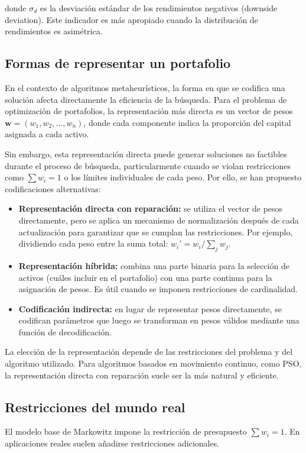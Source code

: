 \documentclass[12pt]{article}
\begin{document}
donde $\sigma_d$ es la desviación estándar de los rendimientos
negativos (downside deviation). Este indicador es más apropiado
cuando la distribución de rendimientos es asimétrica.

\subsection{Formas de representar un portafolio}

En el contexto de algoritmos metaheurísticos, la forma en que se
codifica una solución afecta directamente la eficiencia de la
búsqueda. Para el problema de optimización de portafolios, la
representación más directa es un vector de pesos $\mathbf{w} = (w_1,
w_2, \ldots, w_n)$, donde cada componente indica la proporción del
capital asignada a cada activo.

Sin embargo, esta representación directa puede generar soluciones no
factibles durante el proceso de búsqueda, particularmente cuando se
violan restricciones como $\sum w_i = 1$ o los límites individuales
de cada peso. Por ello, se han propuesto codificaciones alternativas:

\begin{itemize}
  \item \textbf{Representación directa con reparación:} se utiliza el
    vector de pesos directamente, pero se aplica un mecanismo de
    normalización después de cada actualización para garantizar que
    se cumplan las restricciones. Por ejemplo, dividiendo cada peso
    entre la suma total: $w_i' = w_i / \sum_{j} w_j$.

  \item \textbf{Representación híbrida:} combina una parte binaria
    para la selección de activos (cuáles incluir en el portafolio)
    con una parte continua para la asignación de pesos. Es útil
    cuando se imponen restricciones de cardinalidad.

  \item \textbf{Codificación indirecta:} en lugar de representar
    pesos directamente, se codifican parámetros que luego se
    transforman en pesos válidos mediante una función de decodificación.
\end{itemize}

La elección de la representación depende de las restricciones del
problema y del algoritmo utilizado. Para algoritmos basados en
movimiento continuo, como PSO, la representación directa con
reparación suele ser la más natural y eficiente.

\subsection{Restricciones del mundo real}
El modelo base de Markowitz
impone la restricción de presupuesto $\sum w_i = 1$. En aplicaciones
reales suelen añadirse restricciones adicionales.
\end{document}
